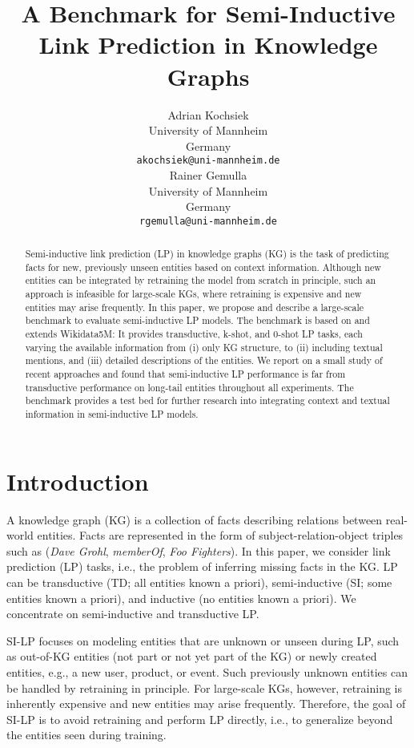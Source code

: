 \documentclass[11pt]{article}
\title{A Benchmark for Semi-Inductive Link Prediction in Knowledge Graphs}
\author{Adrian Kochsiek \\
  University of Mannheim \\
  Germany \\
  \texttt{akochsiek@uni-mannheim.de} \\\And
  Rainer Gemulla \\
  University of Mannheim \\
  Germany \\
  \texttt{rgemulla@uni-mannheim.de} \\}
\renewcommand\:{\colon} \newcommand{\sset}[1]{\left\{\,#1\,\right\}} \newcommand{\ssets}[1]{\left\{#1\right\}} \newcommand{\ssetn}[1]{\{\,#1\,\}}
\begin{document}
\maketitle
\begin{abstract}
  Semi-inductive link prediction (LP) in knowledge graphs (KG) is the task of
  predicting facts for new, previously unseen entities based on context
  information. Although new entities can be integrated by retraining the model
  from scratch in principle, such an approach is infeasible for large-scale KGs,
  where retraining is expensive and new entities may arise frequently. In this
  paper, we propose and describe a large-scale benchmark to evaluate
  semi-inductive LP models. The benchmark is based on and extends Wikidata5M: It
  provides transductive, k-shot, and 0-shot LP tasks, each varying the available
  information from (i) only KG structure, to (ii) including textual mentions,
  and (iii) detailed descriptions of the entities. We report on a small study of
  recent approaches and found that semi-inductive LP performance is far from
  transductive performance on long-tail entities throughout all experiments. The
  benchmark provides a test bed for further research into integrating context and
  textual information in semi-inductive LP models.
\end{abstract}

\section{Introduction}
\label{sec:introduction}
A knowledge graph (KG) is a collection of facts describing relations between
real-world entities. Facts are represented in the form of
subject-relation-object triples such as (\emph{Dave Grohl}, \emph{memberOf},
\emph{Foo Fighters}). In this paper, we consider link prediction (LP) tasks, i.e.,
the problem of inferring missing facts in the KG. LP can be transductive (TD;
all entities known a priori), semi-inductive (SI; some entities known a priori),
and inductive (no entities known a priori).
We concentrate on semi-inductive and transductive LP. 

SI-LP focuses on modeling entities that are unknown or unseen during LP, such
as out-of-KG entities (not part or not yet part of the KG) or newly created
entities, e.g., a new user, product, or event. Such previously unknown entities
can be handled by retraining in principle. For large-scale KGs, however,
retraining is inherently expensive and new entities may arise frequently.
Therefore, the goal of SI-LP is to avoid retraining and perform LP directly,
i.e., to generalize beyond the entities seen during training.
\end{document}
